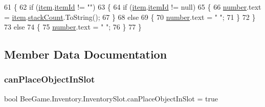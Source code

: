 \begin{DoxyCode}
61         \{
62             \textcolor{keywordflow}{if} (\hyperlink{class_bee_game_1_1_inventory_1_1_inventory_slot_a31b201e7eef9ed0001a447b3f76a7a81}{item}.\hyperlink{struct_bee_game_1_1_items_1_1_item_aa85bfeab893271c26f8ca41b638ada1c}{itemId} != \textcolor{stringliteral}{""})
63             \{
64                 \textcolor{keywordflow}{if} (\hyperlink{class_bee_game_1_1_inventory_1_1_inventory_slot_a31b201e7eef9ed0001a447b3f76a7a81}{item}.\hyperlink{struct_bee_game_1_1_items_1_1_item_aa85bfeab893271c26f8ca41b638ada1c}{itemId} != null)
65                 \{
66                     \hyperlink{class_bee_game_1_1_inventory_1_1_inventory_slot_adbdcece869818ee00193cf27bd9f46d4}{number}.text = \hyperlink{class_bee_game_1_1_inventory_1_1_inventory_slot_a31b201e7eef9ed0001a447b3f76a7a81}{item}.\hyperlink{struct_bee_game_1_1_items_1_1_item_aaa169917b0e0f8472f20398d5d448388}{stackCount}.ToString();
67                 \}
68                 \textcolor{keywordflow}{else}
69                 \{
70                     \hyperlink{class_bee_game_1_1_inventory_1_1_inventory_slot_adbdcece869818ee00193cf27bd9f46d4}{number}.text = \textcolor{stringliteral}{" "};
71                 \}
72             \}
73             \textcolor{keywordflow}{else}
74             \{
75                 \hyperlink{class_bee_game_1_1_inventory_1_1_inventory_slot_adbdcece869818ee00193cf27bd9f46d4}{number}.text = \textcolor{stringliteral}{" "};
76             \}
77         \}
\end{DoxyCode}


\subsection{Member Data Documentation}
\mbox{\label{class_bee_game_1_1_inventory_1_1_inventory_slot_a249f89b637bf8cdb83785b68ce617b4c}} 
\subsubsection{\texorpdfstring{can\+Place\+Object\+In\+Slot}{canPlaceObjectInSlot}}
{\footnotesize\ttfamily bool Bee\+Game.\+Inventory.\+Inventory\+Slot.\+can\+Place\+Object\+In\+Slot = true}



